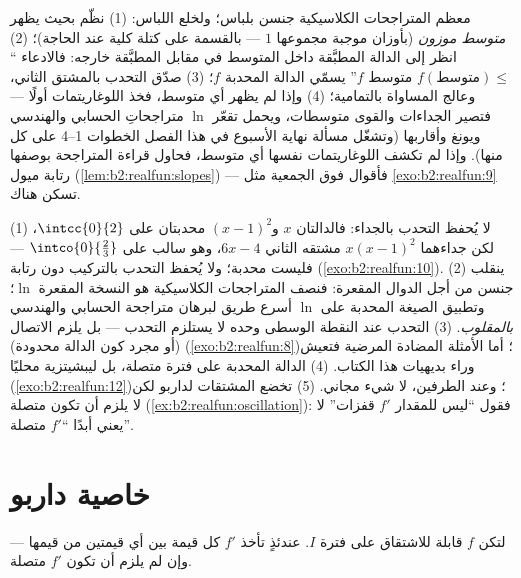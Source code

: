 \begin{method}\label{met:b2:realfun:spotting}
معظم المتراجحات الكلاسيكية جنسن بلباس؛ ولخلع
اللباس: (1) نظّم بحيث يظهر \emph{متوسط موزون}
(بأوزان موجبة مجموعها $1$ --- بالقسمة على كتلة كلية عند
الحاجة)؛ (2) انظر إلى الدالة المطبَّقة داخل المتوسط في مقابل
المطبَّقة خارجه: فالادعاء ``$f(\text{متوسط}) \leq$
متوسط $f$'' يسمّي الدالة المحدبة $f$؛ (3) صدّق التحدب
بالمشتق الثاني، وعالج المساواة بالتمامية؛ (4)
وإذا لم يظهر أي متوسط، فخذ اللوغاريتمات أولًا --- فتصير الجداءات
والقوى متوسطات، ويحمل تقعّر $\ln$
متراجحاتِ الحسابي والهندسي ويونغ وأقاربها (وتشغّل مسألة نهاية
الأسبوع في هذا الفصل الخطوات 1--4 على كل منها). وإذا لم تكشف
اللوغاريتمات نفسها أي متوسط، فحاول قراءة المتراجحة بوصفها
رتابة ميول (\cref{lem:b2:realfun:slopes}) ---
فأقوال فوق الجمعية مثل \cref{exo:b2:realfun:9} تسكن
هناك.
\end{method}

\begin{remark}\label{rem:b2:realfun:pitfalls}
(1) لا يُحفظ التحدب بالجداء: فالدالتان $x$ و$(x - 1)^2$
محدبتان على $\intcc{0}{2}$، لكن جداءهما $x(x-1)^2$ مشتقه
الثاني $6x - 4$، وهو سالب على
$\intco{0}{\frac23}$ --- فليست محدبة؛ ولا يُحفظ التحدب
بالتركيب دون رتابة
(\cref{exo:b2:realfun:10}). (2) ينقلب جنسن من أجل الدوال
المقعرة: فنصف المتراجحات الكلاسيكية هو النسخة
المقعرة $\ln$؛ وتطبيق الصيغة المحدبة على $\ln$ أسرع
طريق لبرهان متراجحة الحسابي والهندسي \emph{بالمقلوب}. (3) التحدب
عند النقطة الوسطى وحده لا يستلزم التحدب --- بل يلزم الاتصال (أو
مجرد كون الدالة محدودة) (\cref{exo:b2:realfun:8})؛ أما
الأمثلة المضادة المرضية فتعيش وراء بديهيات هذا الكتاب. (4)
الدالة المحدبة على فترة \emph{} متصلة،
بل ليبشيتزية محليًا (\cref{exo:b2:realfun:12})؛ وعند
الطرفين، لا شيء مجاني. (5) تخضع المشتقات لداربو لكن
لا يلزم أن تكون متصلة (\cref{ex:b2:realfun:oscillation}):
فقول ``ليس للمقدار $f'$ قفزات'' لا يعني أبدًا ``$f'$ متصلة''.
\end{remark}

\section{خاصية داربو}

\begin{theorem}[داربو]\label{thm:b2:realfun:darboux}
لتكن $f$ قابلة للاشتقاق على فترة $I$. عندئذٍ تأخذ $f'$ كل
قيمة بين أي قيمتين من قيمها --- وإن لم يلزم أن تكون $f'$
متصلة.
\end{theorem}

